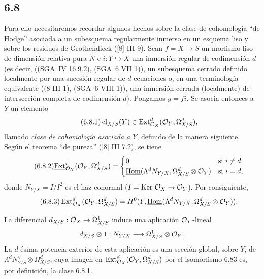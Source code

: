 \subsection*{6.8}
Para ello necesitaremos recordar algunos hechos sobre la clase de cohomología ``de Hodge'' asociada a un subesquema regularmente inmerso en un esquema liso y sobre los residuos de Grothendieck ([8] III 9). Sean $f=X\to S$ un morfismo liso de dimensión relativa pura $N$ e $i:Y\hookrightarrow X$ una inmersión regular de codimensión $d$ (es decir, ((SGA~IV 16.9.2), (SGA~6 VII 1)), un subesquema cerrado definido localmente por una sucesión regular de $d$ ecuaciones o, en una terminología equivalente ((8 III 1), (SGA~6 VIII 1)), una inmersión cerrada (localmente) de intersección completa de codimensión $d$). Pongamos $g=fi$. Se asocia entonces a $Y$ un elemento
\begin{equation}
\tag{6.8.1}
\operatorname{cl}_{X/S}(Y)\in\operatorname{Ext}^d_{\mathcal{O}_X}(\mathcal{O}_Y,\Omega^d_{X/S}),
\end{equation}
llamado \emph{clase de cohomología asociada a $Y$}, definido de la manera siguiente. Según el teorema ``de pureza'' ([8] III 7.2), se tiene
\begin{equation}
\tag{6.8.2}
\underline{\operatorname{Ext}}^i_{\mathcal{O}_X}(\mathcal{O}_Y,\Omega^d_{X/S})=
\begin{cases}
0& \text{si } i\ne d\\
\underline{\operatorname{Hom}}(\Lambda^d N_{Y/X},\Omega^d_{X/S}\otimes\mathcal{O}_Y)& \text{si } i=d,
\end{cases}
\end{equation}
donde $N_{Y/X}=I/I^2$ es el haz conormal ($I=\operatorname{Ker}\,\mathcal{O}_X\to\mathcal{O}_Y$). Por consiguiente,
\begin{equation}
\tag{6.8.3}
\operatorname{Ext}^d_{\mathcal{O}_X}(\mathcal{O}_Y,\Omega^d_{X/S})=H^0(Y,\underline{\operatorname{Hom}}(\Lambda^dN_{Y/X},\Omega^d_{X/S}\otimes\mathcal{O}_Y)).
\end{equation}

La diferencial $d_{X/S}:\mathcal{O}_X\to\Omega^1_{X/S}$ induce una aplicación $\mathcal{O}_Y$-lineal
\[
d_{X/S}\otimes 1:N_{Y/X}\longrightarrow \Omega^1_{X/S}\otimes\mathcal{O}_Y.
\]
La $d$-ésima potencia exterior de esta aplicación es una sección global, sobre $Y$, de $\Lambda^d N_{Y/S}^{\vee}\otimes\Omega^d_{X/S}$, cuya imagen en $\operatorname{Ext}^d_{\mathcal{O}_X}(\mathcal{O}_Y,\Omega^d_{X/S})$ por el isomorfismo 6.83 es, por definición, la clase 6.8.1.


